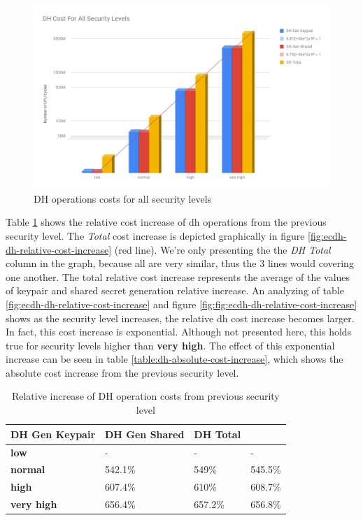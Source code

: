\documentclass{llncs}
\begin{document}
  \begin{figure}
    \centering
    \includegraphics[width=1.0\textwidth]{img/dh_costs_all_sls.png}
    \centering \caption{\label{fig:dh-costs-all-sls} DH operations costs for all security levels}
  \end{figure}

Table \ref{table:dh-relative-cost-increase} shows the relative cost increase of \gls{dh} operations from the previous security level. The \textit{Total}
cost increase is depicted graphically in figure \ref{fig:ecdh-dh-relative-cost-increase} (red line). We're only presenting the the \textit{DH Total} column
in the graph, because all are very similar, thus the $3$ lines would covering one another. The total relative cost increase represents the average of the
values of keypair and shared secret generation relative increase. An analyzing of table \ref{fig:ecdh-dh-relative-cost-increase} and figure
\ref{fig:fig:ecdh-dh-relative-cost-increase} shows as the security level increases, the relative \gls{dh} cost increase becomes larger. In fact,
this cost increase is exponential. Although not presented here, this holds true for security levels higher than \textbf{very high}.
The effect of this exponential increase can be seen in table \ref{table:dh-absolute-cost-increase}, which shows the absolute cost increase from
the previous security level.

\begin{table}[]
  \begin{tabular}{|l|l|l|l|}
  \hline
                     \textbf{DH Gen Keypair} & \textbf{DH Gen Shared}   & \textbf{DH Total}   \\ \hline
  \textbf{low}       & -                       & -                      & -                       \\ \hline
  \textbf{normal}    & 542.1\%                 & 549\%                  & 545.5\%                 \\ \hline
  \textbf{high}      & 607.4\%                 & 610\%                  & 608.7\%                 \\ \hline
  \textbf{very high} & 656.4\%                 & 657.2\%                & 656.8\%                 \\ \hline
  \end{tabular}
  \centering \caption{\label{table:dh-relative-cost-increase} Relative increase of DH operation costs from previous security level}
  \end{table}
\end{document}
